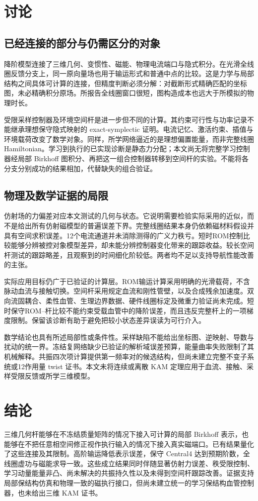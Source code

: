\section{讨论}
\subsection{已经连接的部分与仍需区分的对象}
降阶模型连接了三维几何、变惯性、磁能、物理电流端口与隐式积分。在光滑全线圈反馈分支上，同一原向量场也用于输运形式和普通中点的比较。这是力学与局部结构之间具体可计算的连接，但精度判断必须分解：对截断形式精确匹配的坐标图，未必精确积分原场。所报告全线圈窗口很短，图构造成本也远大于所模拟的物理时长。

受限采样控制器及环境空间杆是进一步但不同的计算。其约束可行性与功率记录不能继承理想保守隐式映射的 exact-symplectic 证明。电流记忆、激活约束、插值与环境载荷改变了数学对象。同样，所学网络逼近的是理想偏置能量，而非完整线圈 Hamiltonian。学习到执行的已实现诊断是静态力分配；本文尚无将完整学习控制器经局部 Birkhoff 图积分、再把这一组合控制器转移到空间杆的实验。不能将各分支分别成功的结果相加，代替缺失的组合验证。

\subsection{物理及数学证据的局限}
仿射场的力偏差对应本文测试的几何与状态。它说明需要检验实际采用的近似，而不是给出所有仿射磁模型的普遍误差下界。完整线圈结果本身仍依赖磁材料假设并具有空间求积误差。12个电流通道并未消除测得的广义力秩亏。短时ROM控制比较能够分辨被控对象模型差异，却未能分辨控制器变化带来的跟踪收益。较长空间杆测试的跟踪略差，且观察到的时间细化阶较低。两者均不足以支持导航性能改善的主张。

实际应用目标仍广于已验证的计算层。ROM输运计算采用明确的光滑载荷，不含脉动血流与接触切换。空间杆采用规定血流和刚性管壁，以及合成残余加速度。双向流固耦合、柔性血管、生理边界数据、硬件线圈标定及微重力验证尚未完成。短时保守ROM--杆比较不能约束受载血管中的降阶误差，而且违反完整杆上的一项梯度限制。保留该诊断有助于避免把较小状态差异误读为可行介入。

数学结论也具有所述局部性或条件性。采样缺陷不能给出坐标图、逆映射、导数与扰动的统一界。冻结复网络缺少已验证的解析域误差预算，能量曲率失败限制了其机械解释。共振四次项计算提供第一频率对的候选结构，但尚未建立完整不变子系统或12作用量 twist 证书。本文未将连续或离散 KAM 定理应用于血流、接触、采样受限反馈或所学三维模型。

\section{结论}
三维几何杆能够在不冻结质量矩阵的情况下接入可计算的局部 Birkhoff 表示，也能够在不把任意相空间修正视作执行输入的情况下接入真实磁端口。已有结果量化了这些连接及其限制。高阶输运降低表示误差，保守 Central4 达到预期阶数，全线圈虚功与磁能求导一致。这些成立结果同时伴随显著仿射力误差、秩受限控制、学习动量能量非凸、尚未解决的共振持久性以及未得到空间杆跟踪改善。证据支持局部保结构仿真和物理一致的磁执行接口，但尚未建立统一的学习保结构血管控制器，也未给出三维 KAM 证书。

